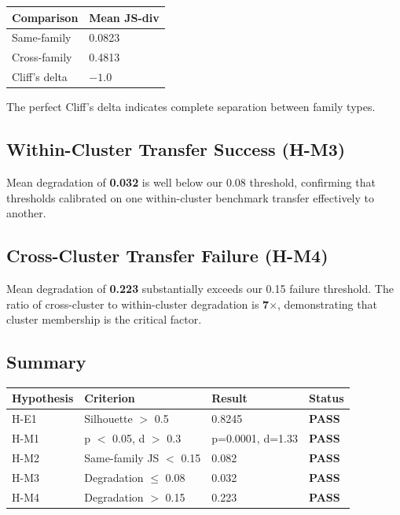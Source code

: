 \begin{table}[h]
\centering
\begin{tabular}{@{}ll@{}}
\toprule
Comparison & Mean JS-div \\
\midrule
Same-family & 0.0823 \\
Cross-family & 0.4813 \\
Cliff's delta & $-1.0$ \\
\bottomrule
\end{tabular}
\end{table}

The perfect Cliff's delta indicates complete separation between family types.

\subsection{Within-Cluster Transfer Success (H-M3)}

Mean degradation of \textbf{0.032} is well below our 0.08 threshold, confirming that thresholds calibrated on one within-cluster benchmark transfer effectively to another.

\subsection{Cross-Cluster Transfer Failure (H-M4)}

Mean degradation of \textbf{0.223} substantially exceeds our 0.15 failure threshold. The ratio of cross-cluster to within-cluster degradation is \textbf{7$\times$}, demonstrating that cluster membership is the critical factor.

\subsection{Summary}

\begin{table}[h]
\centering
\begin{tabular}{@{}llll@{}}
\toprule
Hypothesis & Criterion & Result & Status \\
\midrule
H-E1 & Silhouette $>$ 0.5 & 0.8245 & \textbf{PASS} \\
H-M1 & p $<$ 0.05, d $>$ 0.3 & p=0.0001, d=1.33 & \textbf{PASS} \\
H-M2 & Same-family JS $<$ 0.15 & 0.082 & \textbf{PASS} \\
H-M3 & Degradation $\leq$ 0.08 & 0.032 & \textbf{PASS} \\
H-M4 & Degradation $>$ 0.15 & 0.223 & \textbf{PASS} \\
\bottomrule
\end{tabular}
\end{table}
